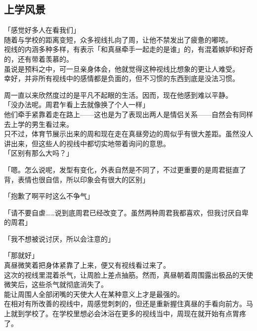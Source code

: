 \subsection{上学风景}

「感觉好多人在看我们」\\

随着与学校的距离变短，众多视线扎向了周，让他不禁发出了疲惫的嘟哝。\\

视线的内涵多种多样，有表示「和真昼牵手一起走的是谁」的，有混着嫉妒和好奇的，还有带着羡慕的。\\

虽说是预料之中，可一旦亲身体会，他就觉得这种视线比想象的更让人难受。\\

幸好，并非所有视线中的感情都是负面的，但不习惯的东西到底是没法习惯。

周一直以来欣然度过的是平凡不起眼的生活。因而，现在他感到难以平静。\\

「没办法呢。周君乍看上去就像换了个人一样」\\

他们牵手紧靠着走在路上——这也是为了表现出两人是情侣关系——自然会有同样去上学的男生看过来。\\

只不过，体育节展示出来的周和现在走在真昼旁边的周似乎有很大差距。虽然没人讲出来，但这些人的视线中都切实地带着询问的意思。\\

「区别有那么大吗？」

「嗯。怎么说呢，发型有变化，外表自然是不同了，不过更重要的是周君挺直了背，表情也很自信，所以印象会有很大的区别」

「抱歉了啊平时这么不争气」

「请不要自虐……说到底周君已经改变了。虽然两种周君我都喜欢，但我讨厌自卑的周君」

「我不想被说讨厌，所以会注意的」

「那就好」\\

真昼微笑着把身体紧靠了上来，便又有视线看过来了。\\

这次的视线里混着杀气，让周脸上差点抽筋。然而，真昼朝着周围露出极品的天使微笑后，这些杀气就彻底消失了。\\

能让周围人全部闭嘴的天使大人在某种意义上才是最强的。\\

在相对有所改善的视线中，周感觉刺刺的，但还是重新握住真昼的手看向前方。马上就到学校了。在学校里想必会沐浴在更多的视线当中，周现在就开始有点胃疼了。\\


